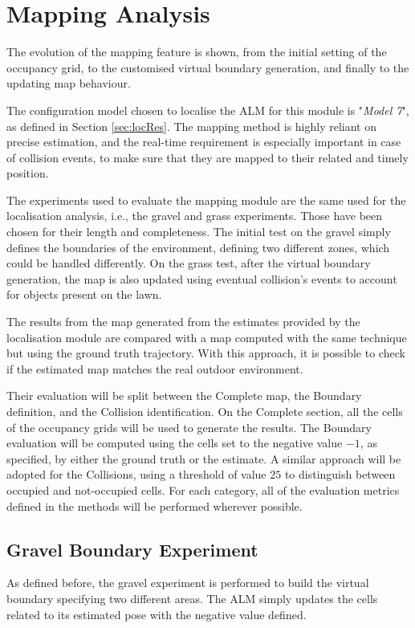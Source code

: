 \section{Mapping Analysis}
\noindent The evolution of the mapping feature is shown, from the initial setting of the occupancy grid, to the customised virtual boundary generation, and finally to the updating map behaviour.

The configuration model chosen to localise the \gls{ALM} for this module is "\textit{Model 7}", as defined in Section \ref{sec:locRes}. 
The mapping method is highly reliant on precise estimation, and the real-time requirement is especially important in case of collision events, to make sure that they are mapped to their related and timely position.

The experiments used to evaluate the mapping module are the same used for the localisation analysis, i.e., the gravel and grass experiments.
Those have been chosen for their length and completeness.
The initial test on the gravel simply defines the boundaries of the environment, defining two different zones, which could be handled differently.
On the grass test, after the virtual boundary generation, the map is also updated using eventual collision's events to account for objects present on the lawn.

The results from the map generated from the estimates provided by the localisation module are compared with a map computed with the same technique but using the ground truth trajectory.
With this approach, it is possible to check if the estimated map matches the real outdoor environment.

Their evaluation will be split between the Complete map, the Boundary definition, and the Collision identification.
On the Complete section, all the cells of the occupancy grids will be used to generate the results.
The Boundary evaluation will be computed using the cells set to the negative value $-1$, as specified, by either the ground truth or the estimate.
A similar approach will be adopted for the Collisions, using a threshold of value $25$ to distinguish between occupied and not-occupied cells.
For each category, all of the evaluation metrics defined in the methods will be performed wherever possible.

\subsection{Gravel Boundary Experiment}
\noindent
As defined before, the gravel experiment is performed to build the virtual boundary specifying two different areas.
The \gls{ALM} simply updates the cells related to its estimated pose with the negative value defined. 


